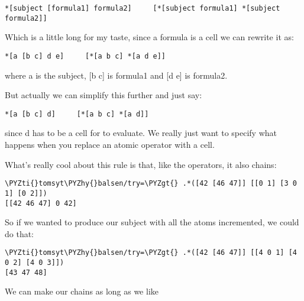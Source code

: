 \begin{framed_shaded}
\begin{Verbatim}[fontsize=\relsize{-2.5},fontseries=b,commandchars=\\\{\}]
*[subject [formula1] formula2]     [*[subject formula1] *[subject formula2]]   
\end{Verbatim}
\end{framed_shaded}
Which is a little long for my taste, since a formula is a cell we can rewrite it as:

\begin{framed_shaded}
\begin{Verbatim}[fontsize=\relsize{-2.5},fontseries=b,commandchars=\\\{\}]
*[a [b c] d e]     [*[a b c] *[a d e]]   
\end{Verbatim}
\end{framed_shaded}
where a is the subject, [b c] is formula1 and [d e] is formula2.

But actually we can simplify this further and just say:

\begin{framed_shaded}
\begin{Verbatim}[fontsize=\relsize{-2.5},fontseries=b,commandchars=\\\{\}]
*[a [b c] d]     [*[a b c] *[a d]]   
\end{Verbatim}
\end{framed_shaded}
since d has to be a cell for \kode{*[a d]} to evaluate. We really just want to
specify what happens when you replace an atomic operator with a cell.

What's really cool about this rule is that, like the operators, it also chains:

\begin{framed_shaded}
\begin{Verbatim}[fontsize=\relsize{-2.5},fontseries=b,commandchars=\\\{\}]
\PYZti{}tomsyt\PYZhy{}balsen/try=\PYZgt{} .*([42 [46 47]] [[0 1] [3 0 1] [0 2]])
[[42 46 47] 0 42]
\end{Verbatim}
\end{framed_shaded}
So if we wanted to produce our subject with all the atoms incremented, we could
do that:

\begin{framed_shaded}
\begin{Verbatim}[fontsize=\relsize{-2.5},fontseries=b,commandchars=\\\{\}]
\PYZti{}tomsyt\PYZhy{}balsen/try=\PYZgt{} .*([42 [46 47]] [[4 0 1] [4 0 2] [4 0 3]])
[43 47 48]
\end{Verbatim}
\end{framed_shaded}
We can make our chains as long as we like

